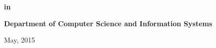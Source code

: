 \documentclass[a4paper,12pt]{report}
\begin{document}
\begin{titlepage}
\begin{center}
\textbf{{\large{in}}}
\end{center}

\begin{center}
\textbf{\Large{Department of Computer Science and Information Systems}}\\
\end{center}

\vspace{0.5cm}
\begin{center}
\Large{May, 2015}
\end{center}
\end{titlepage}

\newpage
\end{document}
